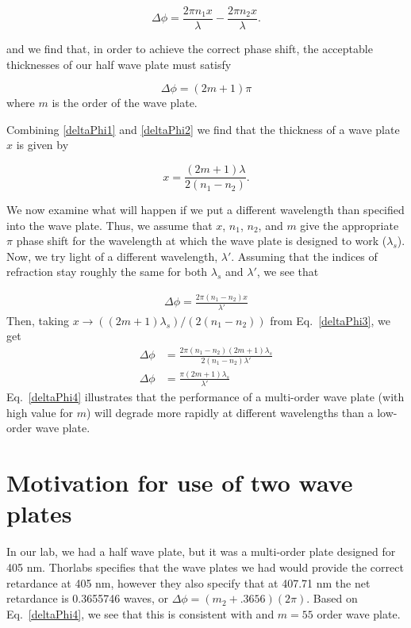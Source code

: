 \begin{equation}
\Delta \phi=\frac{2 \pi n_1 x}{\lambda} -\frac{2 \pi n_2 x}{\lambda}. \label{deltaPhi2}
\end{equation}

and we find that, in order to achieve the correct phase shift, the acceptable thicknesses of our half wave plate must satisfy

\begin{equation}
  \Delta \phi=(2m+1)\pi \label{deltaPhi1}
\end{equation}
where $m$ is the order of the wave plate.

Combining \ref{deltaPhi1} and \ref{deltaPhi2} we find that the thickness of a wave plate $x$ is given by

\begin{equation}
x=\frac{(2m+1) \lambda}{2 (n_1-n_2)}. \label{deltaPhi3}
\end{equation}


We now examine what will happen if we put a different wavelength than specified into the wave plate. Thus, we assume that $x$, $n_1$, $n_2$, and $m$ give the appropriate $\pi$ phase shift for the wavelength at which the wave plate is designed to work ($\lambda_s$). Now, we try light of a different wavelength, $\lambda'$. Assuming that the indices of refraction stay roughly the same for both $\lambda_s$ and $\lambda'$, we see that 

\begin{align}
\Delta \phi=\frac{2 \pi (n_1-n_2) x}{\lambda'} 
\end{align}
Then, taking $x\rightarrow ((2m+1) \lambda_s)/(2 (n_1-n_2))$ from Eq.\ \ref{deltaPhi3}, we get 
\begin{align}
\Delta \phi&=\frac{2 \pi (n_1-n_2) (2m+1) \lambda_s}{2 (n_1-n_2)\lambda'} \\
\Delta \phi&=\frac{\pi (2m+1) \lambda_s}{\lambda'} \label{deltaPhi4}
\end{align}
Eq.\ \ref{deltaPhi4} illustrates that the performance of a multi-order wave plate (with high value for $m$) will degrade more rapidly at different wavelengths than a low-order wave plate. 

\section{Motivation for use of two wave plates}
In our lab, we had a half wave plate, but it was a multi-order plate designed for 405 nm. Thorlabs specifies that the wave plates we had would provide the correct retardance at 405 nm, however they also specify that at 407.71 nm the net retardance is 0.3655746 waves, or $\Delta \phi=(m_2+.3656) (2 \pi)$. Based on Eq.\ \ref{deltaPhi4}, we see that this is consistent with and $m=55$ order wave plate. 

